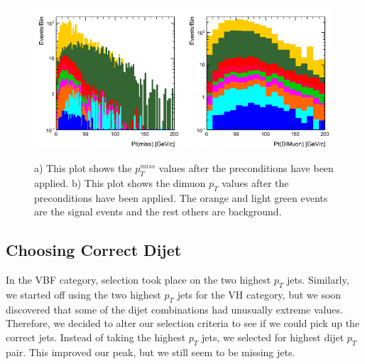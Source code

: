 \documentclass[12pt]{article}
\begin{document}
\begin{figure}[!hbtp]
\begin{center}
    \includegraphics[width=0.49\textwidth]{images/Hist_PtMiss.png}
    \includegraphics[width=0.49\textwidth]{images/Hist_DiMuonPt.png}
    \caption{ \label{fig:myfigurelabel}
         a) This plot shows the $p^{miss}_{T}$ values after the preconditions have been applied. b) This plot shows the dimuon $p_{T}$ values 
	 after the preconditions have been applied. The orange and light green events are the signal events and the rest others are background.
      }
\end{center}
\end{figure} 


\subsection{Choosing Correct Dijet}

In the VBF category, selection took place on the two highest $p_{T}$ jets. 
Similarly, we started off using the two highest $p_{T}$ jets for the VH category, 
but we soon discovered that some of the dijet combinations had unusually extreme values. 
Therefore, we decided to alter our selection criteria to see if we could pick up the correct jets. 
Instead of taking the highest $p_{T}$ jets, we selected for highest dijet $p_{T}$ pair. This improved our peak, but we still seem to be missing jets.
\end{document}
